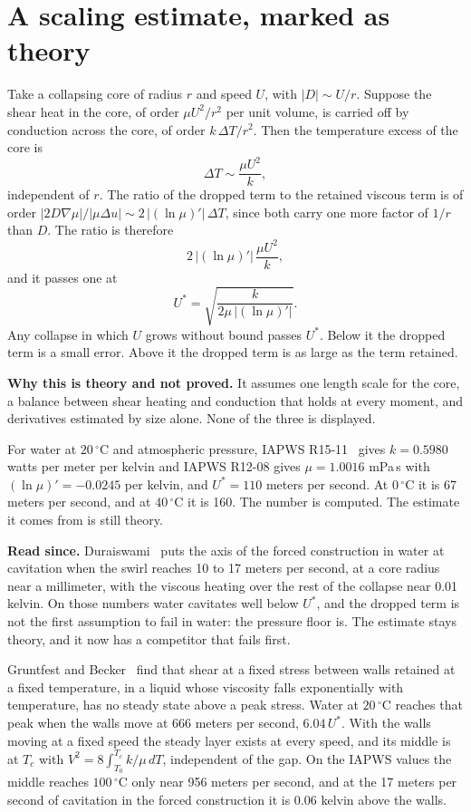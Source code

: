 \section{A scaling estimate, marked as theory}

Take a collapsing core of radius $r$ and speed $U$, with $|D| \sim U/r$. Suppose the shear heat in
the core, of order $\mu U^2/r^2$ per unit volume, is carried off by conduction across the core, of
order $k\,\Delta T/r^2$. Then the temperature excess of the core is
\[
\Delta T \sim \frac{\mu U^2}{k},
\]
independent of $r$. The ratio of the dropped term to the retained viscous term is of order
$|2D\nabla\mu| / |\mu\Delta u| \sim 2\,|(\ln\mu)'|\,\Delta T$, since both carry one more factor of
$1/r$ than $D$. The ratio is therefore
\[
2\,|(\ln\mu)'|\,\frac{\mu U^2}{k},
\]
and it passes one at
\[
U^* = \sqrt{\frac{k}{2\mu\,|(\ln\mu)'|}} .
\]
Any collapse in which $U$ grows without bound passes $U^*$. Below it the dropped term is a small
error. Above it the dropped term is as large as the term retained.

\textbf{Why this is theory and not proved.} It assumes one length scale for the core, a balance
between shear heating and conduction that holds at every moment, and derivatives estimated by size
alone. None of the three is displayed.

For water at $20\,^\circ$C and atmospheric pressure, IAPWS R15-11~\cite{src:IAPWS-R15-11} gives $k = 0.5980$ watts per
meter per kelvin and IAPWS R12-08 gives $\mu = 1.0016$ mPa\,s with $(\ln\mu)' = -0.0245$ per
kelvin, and $U^* = 110$ meters per second. At $0\,^\circ$C it is 67 meters per second, and at
$40\,^\circ$C it is 160. The number is computed. The estimate it comes from is still theory.

\textbf{Read since.} Duraiswami~\cite{src:Duraiswami-2026} puts the axis of the forced
construction in water at cavitation when the swirl reaches 10 to 17 meters per second, at a core
radius near a millimeter, with the viscous heating over the rest of the collapse near 0.01 kelvin.
On those numbers water cavitates well below $U^*$, and the dropped term is not the first
assumption to fail in water: the pressure floor is. The estimate stays theory, and it now has a
competitor that fails first.

Gruntfest and Becker~\cite{src:Gruntfest-and-Becker-1964} find that shear at a fixed stress
between walls retained at a fixed temperature, in a liquid whose viscosity falls exponentially with
temperature, has no steady state above a peak stress. Water at $20\,^\circ$C reaches that peak
when the walls move at 666 meters per second, $6.04\,U^*$. With the walls moving at a fixed speed
the steady layer exists at every speed, and its middle is at $T_c$ with
$V^2 = 8\int_{T_0}^{T_c} k/\mu\,dT$, independent of the gap. On the IAPWS values the middle
reaches $100\,^\circ$C only near 956 meters per second, and at the 17 meters per second of
cavitation in the forced construction it is 0.06 kelvin above the walls.

